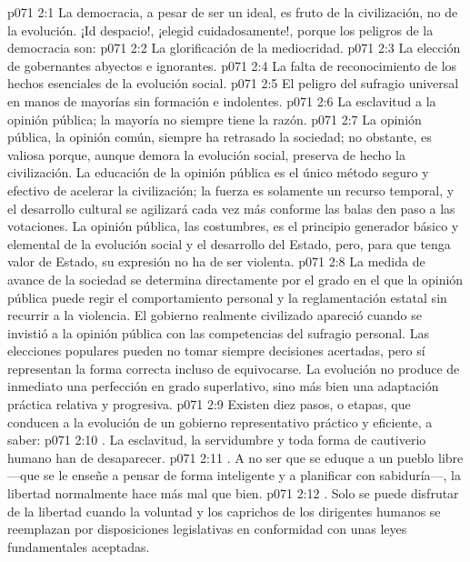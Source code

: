 \vs p071 2:1 La democracia, a pesar de ser un ideal, es fruto de la civilización, no de la evolución. ¡Id despacio!, ¡elegid cuidadosamente!, porque los peligros de la democracia son:
\vs p071 2:2 La glorificación de la mediocridad.
\vs p071 2:3 La elección de gobernantes abyectos e ignorantes.
\vs p071 2:4 La falta de reconocimiento de los hechos esenciales de la evolución social.
\vs p071 2:5 El peligro del sufragio universal en manos de mayorías sin formación e indolentes.
\vs p071 2:6 La esclavitud a la opinión pública; la mayoría no siempre tiene la razón.
\vs p071 2:7 \pc La opinión pública, la opinión común, siempre ha retrasado la sociedad; no obstante, es valiosa porque, aunque demora la evolución social, preserva de hecho la civilización. La educación de la opinión pública es el único método seguro y efectivo de acelerar la civilización; la fuerza es solamente un recurso temporal, y el desarrollo cultural se agilizará cada vez más conforme las balas den paso a las votaciones. La opinión pública, las costumbres, es el principio generador básico y elemental de la evolución social y el desarrollo del Estado, pero, para que tenga valor de Estado, su expresión no ha de ser violenta.
\vs p071 2:8 La medida de avance de la sociedad se determina directamente por el grado en el que la opinión pública puede regir el comportamiento personal y la reglamentación estatal sin recurrir a la violencia. El gobierno realmente civilizado apareció cuando se invistió a la opinión pública con las competencias del sufragio personal. Las elecciones populares pueden no tomar siempre decisiones acertadas, pero sí representan la forma correcta incluso de equivocarse. La evolución no produce de inmediato una perfección en grado superlativo, sino más bien una adaptación práctica relativa y progresiva.
\vs p071 2:9 \pc Existen diez pasos, o etapas, que conducen a la evolución de un gobierno representativo práctico y eficiente, a saber:
\vs p071 2:10 . La esclavitud, la servidumbre y toda forma de cautiverio humano han de desaparecer.
\vs p071 2:11 . A no ser que se eduque a un pueblo libre ---que se le enseñe a pensar de forma inteligente y a planificar con sabiduría---, la libertad normalmente hace más mal que bien.
\vs p071 2:12 . Solo se puede disfrutar de la libertad cuando la voluntad y los caprichos de los dirigentes humanos se reemplazan por disposiciones legislativas en conformidad con unas leyes fundamentales aceptadas.
